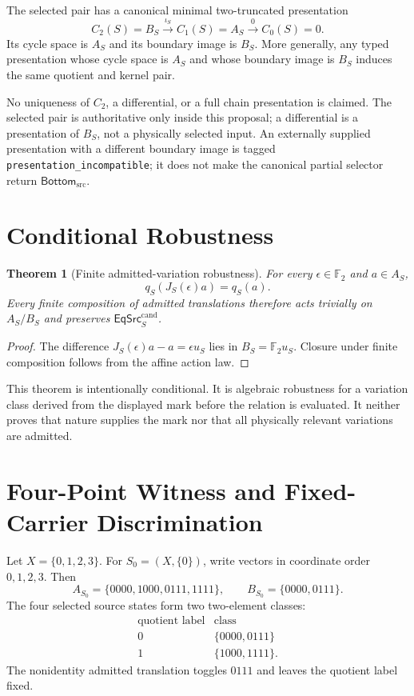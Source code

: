 \documentclass[11pt]{article}
\newtheorem{theorem}{Theorem}
\newcommand{\Ftwo}{\mathbb F_2}
\newcommand{\EqCand}{\mathsf{EqSrc}^{\mathrm{cand}}}
\newcommand{\Bottom}{\mathsf{Bottom}_{\mathrm{src}}}
\begin{document}
The selected pair has a canonical minimal two-truncated presentation
\[
 C_2(S)=B_S\xrightarrow{\iota_S}C_1(S)=A_S
 \xrightarrow{0}C_0(S)=0.
\]
Its cycle space is \(A_S\) and its boundary image is \(B_S\). More generally,
any typed presentation whose cycle space is \(A_S\) and whose boundary image
is \(B_S\) induces the same quotient and kernel pair.

No uniqueness of \(C_2\), a differential, or a full chain presentation is
claimed. The selected pair is authoritative only inside this proposal; a
differential is a presentation of \(B_S\), not a physically selected input.
An externally supplied presentation with a different boundary image is tagged
\texttt{presentation\_incompatible}; it does not make the canonical partial
selector return \(\Bottom\).

\section{Conditional Robustness}

\begin{theorem}[Finite admitted-variation robustness]
For every \(\epsilon\in\Ftwo\) and \(a\in A_S\),
\[
 q_S(J_S(\epsilon)a)=q_S(a).
\]
Every finite composition of admitted translations therefore acts trivially
on \(A_S/B_S\) and preserves \(\EqCand_S\).
\end{theorem}

\begin{proof}
The difference \(J_S(\epsilon)a-a=\epsilon u_S\) lies in
\(B_S=\Ftwo u_S\). Closure under finite composition follows from the affine
action law.
\end{proof}

This theorem is intentionally conditional. It is algebraic robustness for a
variation class derived from the displayed mark before the relation is
evaluated. It neither proves that nature supplies the mark nor that all
physically relevant variations are admitted.

\section{Four-Point Witness and Fixed-Carrier Discrimination}

Let \(X=\{0,1,2,3\}\). For \(S_0=(X,\{0\})\), write vectors in coordinate
order \(0,1,2,3\). Then
\[
 A_{S_0}=\{0000,1000,0111,1111\},\qquad
 B_{S_0}=\{0000,0111\}.
\]
The four selected source states form two two-element classes:
\[
\begin{array}{c|c}
\text{quotient label}&\text{class}\\\hline
0&\{0000,0111\}\\
1&\{1000,1111\}.
\end{array}
\]
The nonidentity admitted translation toggles \(0111\) and leaves the quotient
label fixed.
\end{document}

